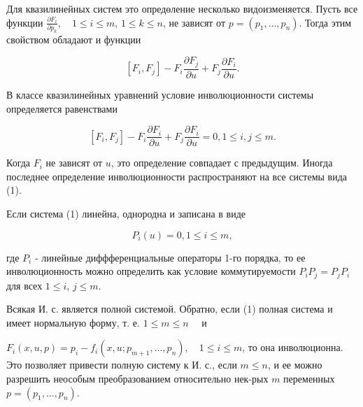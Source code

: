 \documentclass[10pt]{article}
\begin{document}
Для квазилинейных систем это опредөление несколько видоизменяется. Пусть все функции $\frac{\partial F_{i}}{\partial p_{k}}, \quad 1 \leqslant i \leqslant m$, $1 \leqslant k \leqslant n$, не зависят от $p=\left(p_{1}, \ldots, p_{n}\right)$. Тогда этим свойством обладают и функции



\[

\left[F_{i}, F_{j}\right]-F_{i} \frac{\partial F_{j}}{\partial u}+F_{j} \frac{\partial F_{i}}{\partial u} .

\]



В классе квазилинейных уравнений условие инволюционности системы определяется равенствами



\[

\left[F_{i}, F_{j}\right]-F_{i} \frac{\partial F_{i}}{\partial u}+F_{j} \frac{\partial F_{i}}{\partial u}=0,1 \leqslant i, j \leqslant m .

\]



Когда $F_{i}$ не зависят от $u$, это определение совпадает с предыдущим. Иногда последнее определение инволюционности распространяют на все системы вида (1).



Если система (1) линейна, однородна и записана в виде



\[

P_{i}(u)=0,1 \leqslant i \leqslant m,

\]



где $P_{i}$ - линейные диффференциальные операторы 1-го порядка, то ее инволюционность можно определить как условие коммутируемости $P_{i} P_{j}=P_{j} P_{i}$ для всех $1 \leqslant i$, $j \leqslant m$.



Всякая И. с. является полной системой. Обратно, если (1) полная система и имеет нормальную форму, т. е. $1 \leqslant m \leqslant n \quad$ и



$F_{i}(x, u, p)=p_{i}-f_{i}\left(x, u ; p_{m+1}, \ldots, p_{n}\right), \quad 1 \leqslant i \leqslant m$, то она инволюционна. Это позволяет привести полную систему к И. с., если $m \leqslant n$, и ее можно разрешить неособым преобразованием относительно нек-рых $m$ переменных $p=\left(p_{1}, \ldots, p_{n}\right)$.
\end{document}
